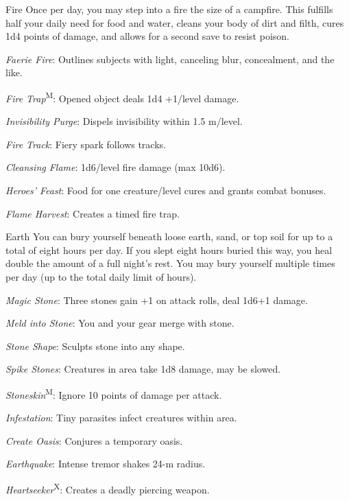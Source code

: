 {Fire}
{Once per day, you may step into a fire the size of a campfire. This fulfills half your daily need for food and water, cleans your body of dirt and filth, cures 1d4 points of damage, and allows for a second save to resist poison.}
{
	\item \textit{Faerie Fire}: Outlines subjects with light, canceling blur, concealment, and the like.
	\item \textit{Fire Trap}\textsuperscript{M}: Opened object deals 1d4 +1/level damage.
	\item \textit{Invisibility Purge}: Dispels invisibility within 1.5 m/level.
	\item \textit{Fire Track}: Fiery spark follows tracks.
	\item \textit{Cleansing Flame}: 1d6/level fire damage (max 10d6).
	\item \textit{Heroes' Feast}: Food for one creature/level cures and grants combat bonuses.
	\item \textit{Flame Harvest}: Creates a timed fire trap.
	\item 
	\item 
}

{Earth}
{You can bury yourself beneath loose earth, sand, or top soil for up to a total of eight hours per day. If you slept eight hours buried this way, you heal double the amount of a full night's rest. You may bury yourself multiple times per day (up to the total daily limit of hours).}
{
	\item \textit{Magic Stone}: Three stones gain +1 on attack rolls, deal 1d6+1 damage.
	\item \textit{Meld into Stone}: You and your gear merge with stone.
	\item \textit{Stone Shape}: Sculpts stone into any shape.
	\item \textit{Spike Stones}: Creatures in area take 1d8 damage, may be slowed.
	\item \textit{Stoneskin}\textsuperscript{M}: Ignore 10 points of damage per attack.
	\item \textit{Infestation}: Tiny parasites infect creatures within area.
	\item \textit{Create Oasis}: Conjures a temporary oasis.
	\item \textit{Earthquake}: Intense tremor shakes 24-m radius.
	\item \textit{Heartseeker}\textsuperscript{X}: Creates a deadly piercing weapon.
}

